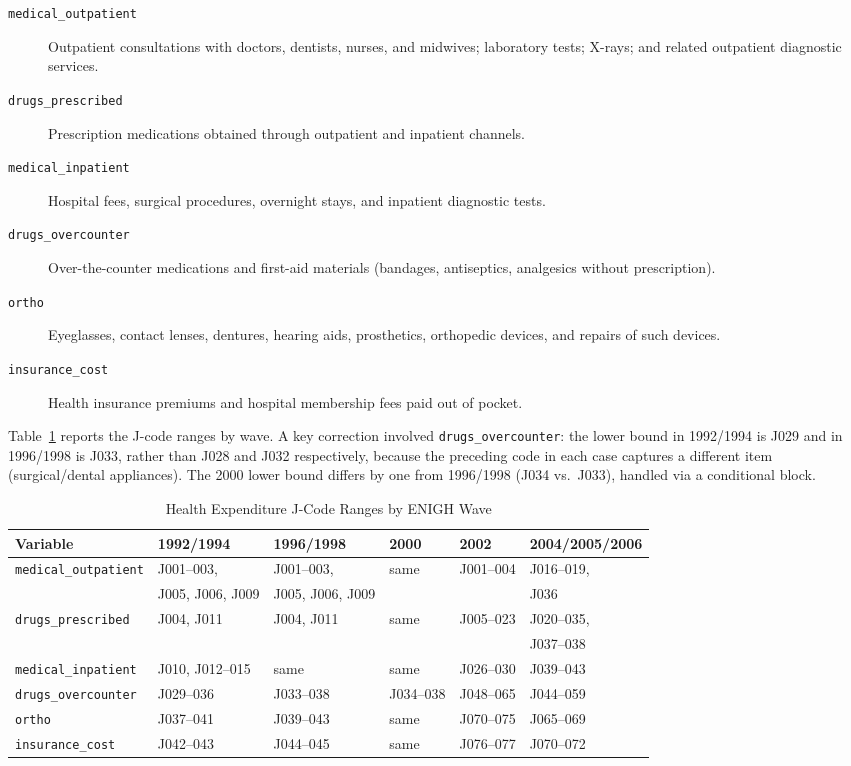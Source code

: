 \begin{description}
  \item[\texttt{medical\_outpatient}] Outpatient consultations with doctors,
    dentists, nurses, and midwives; laboratory tests; X-rays; and related
    outpatient diagnostic services.
  \item[\texttt{drugs\_prescribed}] Prescription medications obtained through
    outpatient and inpatient channels.
  \item[\texttt{medical\_inpatient}] Hospital fees, surgical procedures,
    overnight stays, and inpatient diagnostic tests.
  \item[\texttt{drugs\_overcounter}] Over-the-counter medications and first-aid
    materials (bandages, antiseptics, analgesics without prescription).
  \item[\texttt{ortho}] Eyeglasses, contact lenses, dentures, hearing aids,
    prosthetics, orthopedic devices, and repairs of such devices.
  \item[\texttt{insurance\_cost}] Health insurance premiums and hospital
    membership fees paid out of pocket.
\end{description}

Table~\ref{tab:health_jcodes} reports the J-code ranges by wave. A key
correction involved \texttt{drugs\_overcounter}: the lower bound in
1992/1994 is J029 and in 1996/1998 is J033, rather than J028 and J032
respectively, because the preceding code in each case captures a different item
(surgical/dental appliances). The 2000 lower bound differs by one from
1996/1998 (J034 vs.\ J033), handled via a conditional block.

\begin{table}[h!]
\centering
\caption{Health Expenditure J-Code Ranges by ENIGH Wave}
\label{tab:health_jcodes}
\small
\begin{tabular}{llllll}
\hline\hline
Variable & 1992/1994 & 1996/1998 & 2000 & 2002 & 2004/2005/2006 \\
\hline
\texttt{medical\_outpatient} & J001--003, & J001--003, & same & J001--004 & J016--019, \\
                              & J005, J006, J009 & J005, J006, J009 & & & J036 \\
\texttt{drugs\_prescribed}   & J004, J011 & J004, J011 & same & J005--023 & J020--035, \\
                              &            &            &      &           & J037--038 \\
\texttt{medical\_inpatient}  & J010, J012--015 & same & same & J026--030 & J039--043 \\
\texttt{drugs\_overcounter}  & J029--036 & J033--038 & J034--038 & J048--065 & J044--059 \\
\texttt{ortho}               & J037--041 & J039--043 & same & J070--075 & J065--069 \\
\texttt{insurance\_cost}     & J042--043 & J044--045 & same & J076--077 & J070--072 \\
\hline\hline
\end{tabular}
\end{table}

